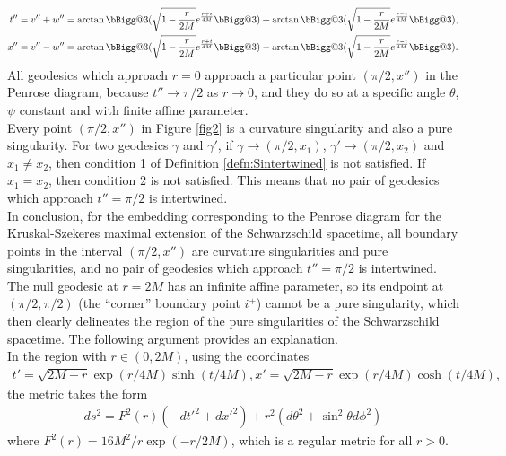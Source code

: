 \documentclass[pdflatex,sn-mathphys-num]{sn-jnl}
\makeatletter
\newcommand{\Vast}{\bBigg@{3}}
\theoremstyle{definition}
\makeatother
\begin{document}
\begin{align*}
    t'' = v'' + w'' = \arctan{\Vast(\sqrt{1-\frac{r}{2M}}e^{\frac{r+t}{4M}}\Vast)} + \arctan{\Vast(\sqrt{1-\frac{r}{2M}}e^{\frac{r-t}{4M}}\Vast)},\\
    x'' = v'' - w'' = \arctan{\Vast(\sqrt{1-\frac{r}{2M}}e^{\frac{r+t}{4M}}\Vast)} - \arctan{\Vast(\sqrt{1-\frac{r}{2M}}e^{\frac{r-t}{4M}}\Vast)}.
\end{align*}
All geodesics which approach $r=0$ approach a particular point $(\pi/2,x'')$ in the Penrose diagram, because $t'' \rightarrow \pi/2$ as $r \rightarrow 0$, and they do so at a specific angle $\theta$, $\psi$ constant and with finite affine parameter.\\

Every point $(\pi/2, x'')$ in Figure \ref{fig2} is a curvature singularity and also a pure singularity. For two geodesics $\gamma$ and $\gamma'$, if $\gamma \rightarrow (\pi/2,x_1)$, $\gamma' \rightarrow (\pi/2,x_2)$ and $x_1 \neq x_2$, then condition 1 of Definition \ref{defn:Sintertwined} is not satisfied. If $x_1 = x_2$, then condition 2 is not satisfied. This means that no pair of geodesics which approach $t'' = \pi/2$ is intertwined.\\

In conclusion, for the embedding corresponding to the Penrose diagram for the Kruskal-Szekeres maximal extension of the Schwarzschild spacetime, all boundary points in the interval $(\pi/2,x'')$ are curvature singularities and pure singularities, and no pair of geodesics which approach $t''=\pi/2$ is intertwined.\\

The null geodesic at $r=2M$ has an infinite affine parameter, so its endpoint at $(\pi/2,\pi/2)$ (the ``corner'' boundary point $i^{+}$) cannot be a pure singularity, which then clearly delineates the region of the pure singularities of the Schwarzschild spacetime. The following argument provides an explanation.\\

In the region with $r \in (0,2M)$, using the coordinates 
\begin{align*}
t' = \sqrt{2M-r}\exp{(r/4M)}\sinh{(t/4M)}, x' = \sqrt{2M-r}\exp{(r/4M)}\cosh{(t/4M)},
\end{align*}
    the metric takes the form
\begin{align}
    ds^2 = F^2(r)(-dt'^2 + dx'^2) + r^2(d\theta^2 + \sin^2\theta d\phi^2)\label{metric:t'x'}
\end{align}
where $F^2(r) = 16M^2/r\exp(-r/2M)$, which is a regular metric for all $r > 0$.\\
\end{document}
